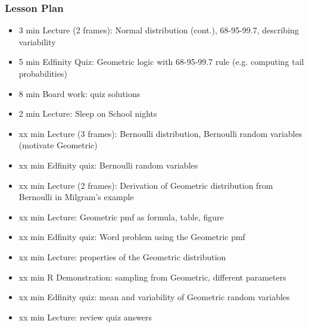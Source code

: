 \begin{frame}
    \frametitle{Lesson Plan}
    \begin{itemize}
        \item 3 min Lecture (2 frames): Normal distribution (cont.), 68-95-99.7, describing variability
        \item 5 min Edfinity Quiz: Geometric logic with 68-95-99.7 rule (e.g. computing tail probabilities)
        \item 8 min Board work: quiz solutions
        \item 2 min Lecture: Sleep on School nights

        \item xx min Lecture (3 frames): Bernoulli distribution, Bernoulli random variables (motivate Geometric)
        \item xx min Edfinity quiz: Bernoulli random variables
        \item xx min Lecture (2 frames): Derivation of Geometric distribution from Bernoulli in Milgram's example
        \item xx min Lecture: Geometric pmf as formula, table, figure
        \item xx min Edfinity quiz: Word problem using the Geometric pmf
        \item xx min Lecture: properties of the Geometric distribution
        \item xx min R Demonstration: sampling from Geometric, different parameters
        \item xx min Edfinity quiz: mean and variability of Geometric random variables
        \item xx min Lecture: review quiz answers
    \end{itemize}
\end{frame}



